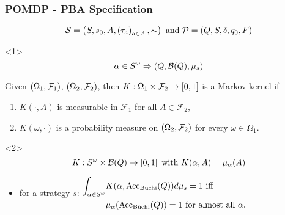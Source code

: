 \documentclass{beamer}
\begin{document}
\begin{frame}
    \frametitle{\ac{POMDP} - \ac{PBA} Specification}
    \begin{overlayarea}{\textwidth}{0.2\textheight}
      \begin{equation*}
        \mathcal{S} = \left(S, s_{0}, A, \left(\tau_{a}\right)_{a\in A}, \sim\right)
        \text{ and }
        \mathcal{P} = \left(Q, S, \delta, q_{0}, F\right)
      \end{equation*}
    \end{overlayarea}
    \begin{overlayarea}{\textwidth}{0.8\textheight}
      \begin{onlyenv}<1>
        \begin{equation*}
          \alpha\in S^{\omega}\Rightarrow\left(Q, \mathcal{B}(Q), \mu_{s}\right)
        \end{equation*}
        \begin{definition}
          Given $\left(\Omega_{1},\mathcal{F}_{1}\right)$,
          $\left(\Omega_{2},\mathcal{F}_{2}\right)$, then
          $K:\Omega_{1}\times\mathcal{F}_{2}\rightarrow \left[0,1\right]$ is a
          Markov-kernel if
          \begin{enumerate}
            \item $K(\cdot, A)$ is measurable in $\mathcal{F}_{1}$ for all
              $A\in\mathcal{F}_{2}$,
            \item $K(\omega, \cdot)$ is a probability measure on
              $\left(\Omega_{2},\mathcal{F}_{2}\right)$ for every
              $\omega\in\Omega_{1}$.
          \end{enumerate}
        \end{definition}
      \end{onlyenv}
      \begin{onlyenv}<2>
        \begin{equation*}
          K:S^{\omega}\times\mathcal{B}(Q)\rightarrow\left[0,1\right]
          \text{ with }
          K(\alpha, A) = \mu_{\alpha}(A)
        \end{equation*}
        \begin{itemize}
          \item for a strategy $s$:
            $\begin{aligned}
              \int_{\alpha\in S^{\omega}}&K(\alpha, \operatorname{Acc}_{\operatorname{B\ddot{u}chi}}(Q))d\mu_{s}
              = 1\text{ iff }\\
              &\mu_{\alpha}(\operatorname{Acc}_{\operatorname{B\ddot{u}chi}}(Q)) = 1\text{ for almost all }\alpha.
            \end{aligned}$

\end{itemize}
\end{onlyenv}
\end{overlayarea}
\end{frame}
\end{document}
